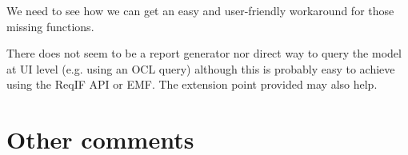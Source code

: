 \begin{assessor1}
We need to see how we can get an easy and user-friendly workaround for those missing functions. 
\end{assessor1}

\begin{assessor2}
There does not seem to be a report generator nor direct way to query the model at UI level (e.g. using an OCL query) although this is probably easy to achieve using the ReqIF API or EMF. The extension point provided may also help.
\end{assessor2}


\section{Other comments}



\begin{comment}
This section is available for the author or the assessors to  complete the description and criteria.
\end{comment}




